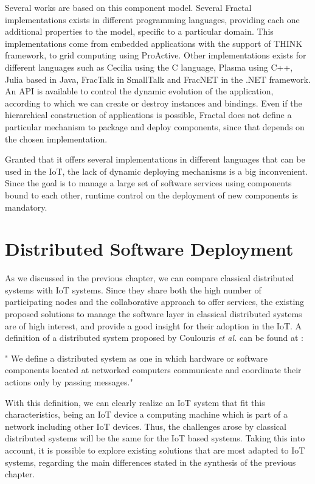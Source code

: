 Several works\cite{david2005wildcat}\cite{bouchenak2006autonomic}\cite{leclercq2004dream}\cite{romero2010restful} are based on this component model.
Several Fractal implementations exists in different programming languages, providing each one additional properties to the model, specific to a particular domain.
This implementations come from embedded applications with the support of THINK framework\cite{fassino2002think}\cite{polakovic2006building}\cite{hoang2008valentine}, to grid computing using ProActive\cite{caromel2006proactive}.
Other implementations exists for different languages such as Cecilia\cite{cecilia2015} using the C language, Plasma using C++, Julia\cite{bruneton2006fractal} based in Java, FracTalk in SmallTalk and FracNET in the .NET framework.
An API is available to control the dynamic evolution of the application, according to which we can create or destroy instances and bindings.
Even if the hierarchical construction of applications is possible, Fractal does not define a particular mechanism to package and deploy components, since that depends on the chosen implementation.

Granted that it offers several implementations in different languages that can be used in the IoT, the lack of dynamic deploying mechanisms is a big inconvenient.
Since the goal is to manage a large set of software services using components bound to each other, runtime control on the deployment of new components is mandatory.

\section{Distributed Software Deployment}
As we discussed in the previous chapter, we can compare classical distributed systems with IoT systems.
Since they share both the high number of participating nodes and the collaborative approach to offer services, the existing proposed solutions to manage the software layer in classical distributed systems are of high interest, and provide a good insight for their adoption in the IoT.
A definition of a distributed system proposed by Coulouris \textit{et al.} can be found at \cite{coulouris2005distributed}:
\begin{citeverbatim}
	" We define a distributed system as one in which hardware or software components located at networked computers communicate and coordinate their actions only by passing messages."
\end{citeverbatim}
With this definition, we can clearly realize an IoT system that fit this characteristics, being an IoT device a computing machine which is part of a network including other IoT devices.
Thus, the challenges arose by classical distributed systems will be the same for the IoT based systems.
Taking this into account, it is possible to explore existing solutions that are most adapted to IoT systems, regarding the main differences stated in the synthesis of the previous chapter.

